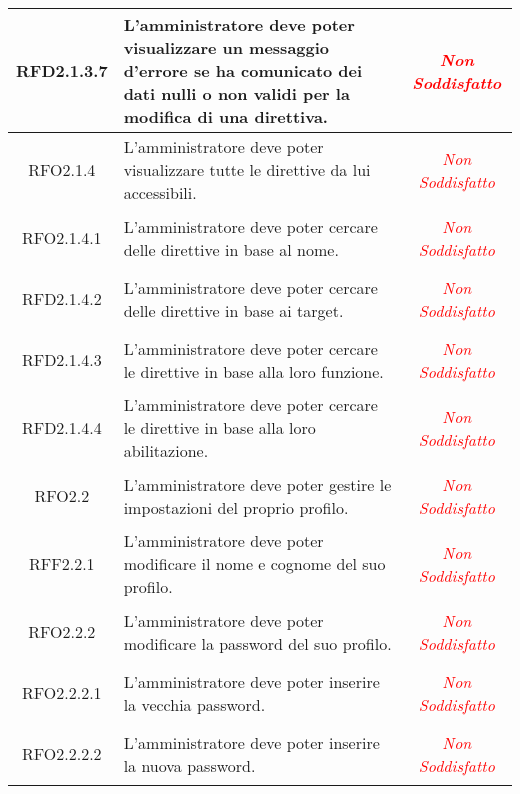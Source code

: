 \begin{longtable}{|c|>{\centering}m{7cm}|c|}
\hypertarget{RFD2.1.3.7}{RFD2.1.3.7} & L'amministratore deve poter visualizzare un messaggio d'errore se ha comunicato dei dati nulli o non validi per la modifica di una direttiva. & \textcolor{Red}{\textit{Non Soddisfatto}}\\ \hline

\hypertarget{RFO2.1.4}{RFO2.1.4} & L'amministratore deve poter visualizzare tutte le direttive da lui accessibili. & \textcolor{Red}{\textit{Non Soddisfatto}}\\ \hline

\hypertarget{RFO2.1.4.1}{RFO2.1.4.1} & L'amministratore deve poter cercare delle direttive in base al nome. & \textcolor{Red}{\textit{Non Soddisfatto}}\\ \hline

\hypertarget{RFD2.1.4.2}{RFD2.1.4.2} & L'amministratore deve poter cercare delle direttive in base ai target. & \textcolor{Red}{\textit{Non Soddisfatto}}\\ \hline

\hypertarget{RFD2.1.4.3}{RFD2.1.4.3} & L'amministratore deve poter cercare le direttive in base alla loro funzione. & \textcolor{Red}{\textit{Non Soddisfatto}}\\ \hline

\hypertarget{RFD2.1.4.4}{RFD2.1.4.4} & L'amministratore deve poter cercare le direttive in base alla loro abilitazione. & \textcolor{Red}{\textit{Non Soddisfatto}}\\ \hline

\hypertarget{RFO2.2}{RFO2.2} & L'amministratore deve poter gestire le impostazioni del proprio profilo. & \textcolor{Red}{\textit{Non Soddisfatto}}\\ \hline

\hypertarget{RFF2.2.1}{RFF2.2.1} & L'amministratore deve poter modificare il nome e cognome del suo profilo. & \textcolor{Red}{\textit{Non Soddisfatto}}\\ \hline

\hypertarget{RFO2.2.2}{RFO2.2.2} & L'amministratore deve poter modificare la password del suo profilo. & \textcolor{Red}{\textit{Non Soddisfatto}}\\ \hline

\hypertarget{RFO2.2.2.1}{RFO2.2.2.1} & L'amministratore deve poter inserire la vecchia password. & \textcolor{Red}{\textit{Non Soddisfatto}}\\ \hline

\hypertarget{RFO2.2.2.2}{RFO2.2.2.2} & L'amministratore deve poter inserire la nuova password. & \textcolor{Red}{\textit{Non Soddisfatto}}\\ \hline


\end{longtable}
